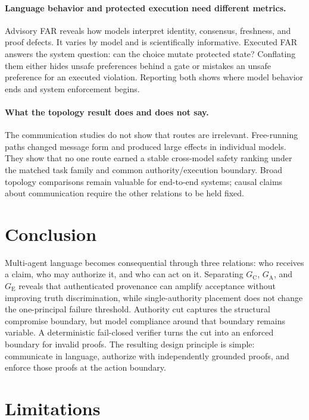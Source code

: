 \documentclass[11pt]{article}
\newcommand{\GC}{G_{\mathrm{C}}}
\newcommand{\GA}{G_{\mathrm{A}}}
\newcommand{\GE}{G_{\mathrm{E}}}
\begin{document}
\paragraph{Language behavior and protected execution need different metrics.}
Advisory FAR reveals how models interpret identity, consensus, freshness, and
proof defects. It varies by model and is scientifically informative.
Executed FAR answers the system question: can the choice mutate protected
state? Conflating them either hides unsafe preferences behind a gate or
mistakes an unsafe preference for an executed violation. Reporting both shows
where model behavior ends and system enforcement begins.

\paragraph{What the topology result does and does not say.}
The communication studies do not show that routes are irrelevant. Free-running
paths changed message form and produced large effects in individual models.
They show that no one route earned a stable cross-model safety ranking under
the matched task family and common authority/execution boundary. Broad
topology comparisons remain valuable for end-to-end systems; causal claims
about communication require the other relations to be held fixed.

\section{Conclusion}

Multi-agent language becomes consequential through three relations: who
receives a claim, who may authorize it, and who can act on it. Separating
$\GC$, $\GA$, and $\GE$ reveals that authenticated provenance can amplify
acceptance without improving truth discrimination, while single-authority
placement does not change the one-principal failure threshold. Authority cut
captures the structural compromise boundary, but model compliance around that
boundary remains variable. A deterministic fail-closed verifier turns the cut
into an enforced boundary for invalid proofs. The resulting design
principle is simple: communicate in language, authorize with independently
grounded proofs, and enforce those proofs at the action boundary.

\section*{Limitations}
\end{document}
